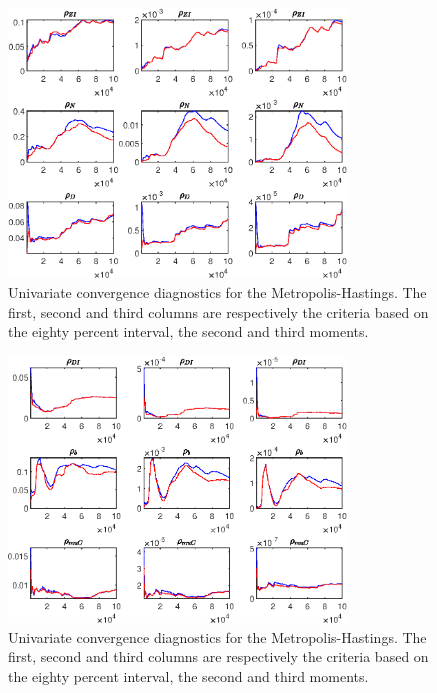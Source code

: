 \begin{figure}[H]
\centering 
\includegraphics[width=0.80\textwidth]{BRS_sectoral/Output/BRS_sectoral_udiag11}
\caption{Univariate convergence diagnostics for the Metropolis-Hastings.
The first, second and third columns are respectively the criteria based on
the eighty percent interval, the second and third moments.}\label{Fig:UnivariateDiagnostics:11}
\end{figure}

\begin{figure}[H]
\centering 
\includegraphics[width=0.80\textwidth]{BRS_sectoral/Output/BRS_sectoral_udiag12}
\caption{Univariate convergence diagnostics for the Metropolis-Hastings.
The first, second and third columns are respectively the criteria based on
the eighty percent interval, the second and third moments.}\label{Fig:UnivariateDiagnostics:12}
\end{figure}

